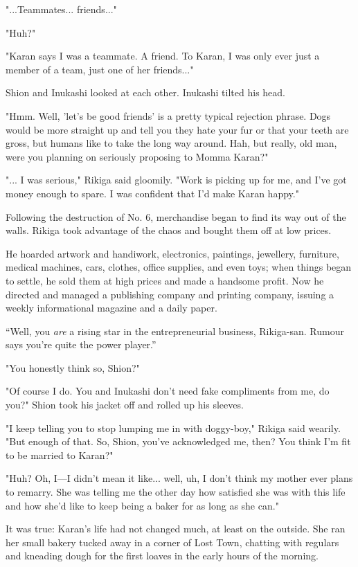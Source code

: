 "...Teammates... friends..."

"Huh?"

"Karan says I was a teammate. A friend. To Karan, I was only ever just a
member of a team, just one of her friends..."

Shion and Inukashi looked at each other. Inukashi tilted his head.

"Hmm. Well, 'let's be good friends' is a pretty typical rejection
phrase. Dogs would be more straight up and tell you they hate your fur
or that your teeth are gross, but humans like to take the long way
around. Hah, but really, old man, were you planning on seriously
proposing to Momma Karan?"

"... I was serious," Rikiga said gloomily. "Work is picking up for me,
and I've got money enough to spare. I was confident that I'd make Karan
happy."

Following the destruction of No. 6, merchandise began to find its way
out of the walls. Rikiga took advantage of the chaos and bought them off
at low prices.

He hoarded artwork and handiwork, electronics, paintings, jewellery,
furniture, medical machines, cars, clothes, office supplies, and even
toys; when things began to settle, he sold them at high prices and made
a handsome profit. Now he directed and managed a publishing company and
printing company, issuing a weekly informational magazine and a daily
paper.

``Well, you \emph{are} a rising star in the entrepreneurial business,
Rikiga-san. Rumour says you're quite the power player.''

"You honestly think so, Shion?"

"Of course I do. You and Inukashi don't need fake compliments from me,
do you?" Shion took his jacket off and rolled up his sleeves.

"I keep telling you to stop lumping me in with doggy-boy," Rikiga said
wearily. "But enough of that. So, Shion, you've acknowledged me, then?
You think I'm fit to be married to Karan?"

"Huh? Oh, I---I didn't mean it like... well, uh, I don't think my mother
ever plans to remarry. She was telling me the other day how satisfied
she was with this life and how she'd like to keep being a baker for as
long as she can."

It was true: Karan's life had not changed much, at least on the outside.
She ran her small bakery tucked away in a corner of Lost Town, chatting
with regulars and kneading dough for the first loaves in the early hours
of the morning.

